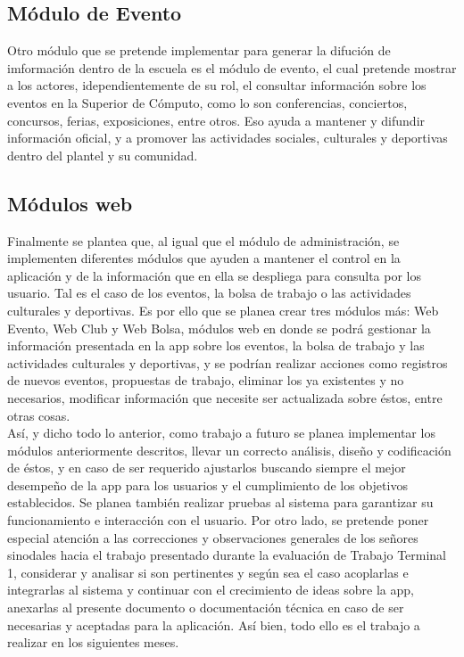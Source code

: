 \subsection{Módulo de Evento}
\noindent
Otro módulo que se pretende implementar para generar la difución de imformación dentro de la escuela es el módulo de evento, el cual pretende mostrar a los actores, idependientemente de su rol, el consultar información sobre los eventos en la Superior de Cómputo, como lo son conferencias, conciertos, concursos, ferias, exposiciones, entre otros. Eso ayuda a mantener y difundir información oficial, y a promover las actividades sociales, culturales y deportivas dentro del plantel y su comunidad. \\

\subsection{Módulos web}
\noindent
Finalmente se plantea que, al igual que el módulo de administración, se implementen diferentes módulos que ayuden a mantener el control en la aplicación y de la información que en ella se despliega para consulta por los usuario. Tal es el caso de los eventos, la bolsa de trabajo o las actividades culturales y deportivas. Es por ello que se planea crear tres módulos más: Web Evento, Web Club y Web Bolsa, módulos web en donde se podrá gestionar la información presentada en la app sobre los eventos, la bolsa de trabajo y las actividades culturales y deportivas, y se podrían realizar acciones como registros de nuevos eventos, propuestas de trabajo, eliminar los ya existentes y no necesarios, modificar información que necesite ser actualizada sobre éstos, entre otras cosas. \\

\noindent
Así, y dicho todo lo anterior, como trabajo a futuro se planea implementar los módulos anteriormente descritos, llevar un correcto análisis, diseño y codificación de éstos, y en caso de ser requerido ajustarlos buscando siempre el mejor desempeño de la app para los usuarios y el cumplimiento de los objetivos establecidos. Se planea también realizar pruebas al sistema para garantizar su funcionamiento e interacción con el usuario. Por otro lado, se pretende poner especial atención a las correcciones y observaciones generales de los señores sinodales hacia el trabajo presentado durante la evaluación de Trabajo Terminal 1, considerar y analisar si son pertinentes y según sea el caso acoplarlas e integrarlas al sistema y continuar con el crecimiento de ideas sobre la app, anexarlas al presente documento o documentación técnica en caso de ser necesarias y aceptadas para la aplicación. Así bien, todo ello es el trabajo a realizar en los siguientes meses. 


